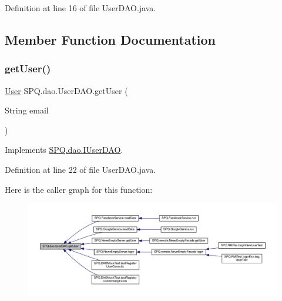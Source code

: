 Definition at line 16 of file User\+D\+A\+O.\+java.



\subsection{Member Function Documentation}
\mbox{\label{class_s_p_q_1_1dao_1_1_user_d_a_o_aeb3901e9e260ad977a1b412fe7a9fc0e}} 
\subsubsection{\texorpdfstring{get\+User()}{getUser()}\hspace{0.1cm}{\footnotesize\ttfamily [1/3]}}
{\footnotesize\ttfamily \mbox{\hyperlink{class_s_p_q_1_1data_1_1_user}{User}} S\+P\+Q.\+dao.\+User\+D\+A\+O.\+get\+User (\begin{DoxyParamCaption}\item[{String}]{email }\end{DoxyParamCaption})}



Implements \mbox{\hyperlink{interface_s_p_q_1_1dao_1_1_i_user_d_a_o_ac53b137d5e0828058457e59fa70c2b95}{S\+P\+Q.\+dao.\+I\+User\+D\+AO}}.



Definition at line 22 of file User\+D\+A\+O.\+java.

Here is the caller graph for this function\+:
\nopagebreak
\begin{figure}[H]
\begin{center}
\leavevmode
\includegraphics[width=350pt]{class_s_p_q_1_1dao_1_1_user_d_a_o_aeb3901e9e260ad977a1b412fe7a9fc0e_icgraph}
\end{center}
\end{figure}
\mbox{\label{class_s_p_q_1_1dao_1_1_user_d_a_o_aeb3901e9e260ad977a1b412fe7a9fc0e}} 
